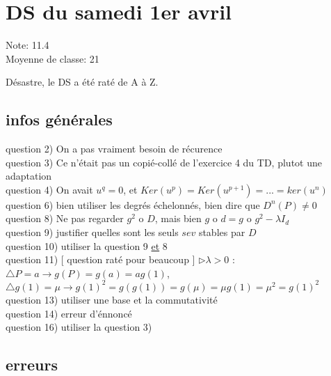 \documentclass{book}
\begin{document}
\section{DS du samedi 1er avril }

Note: 11.4\\
Moyenne de classe: 21 \\


\begin{tcolorbox}[width={14cm},colback={yellow!20!white},title={\textbf{Commentaire générale sur ce DS}},colbacktitle=red!40!white,coltitle=black]    
	Désastre, le DS a été raté de A à Z.
\end{tcolorbox}


\subsection{infos générales}

question 2) On a pas vraiment besoin de récurence \\
question 3) Ce n'était pas un copié-collé de l'exercice 4 du TD, plutot une adaptation \\
question 4) On avait $u^q= 0$, et $Ker(u^p) = Ker(u^{p+1}) = ... = ker(u^n)$ \\
question 6) bien utiliser les degrés échelonnés, bien dire que $D^n(P) \not = 0$ \\
question 8) Ne pas regarder $g^2$ o $D$, mais bien $g$ o $d = g$ o $g^2 - \lambda I_d$ \\
question 9) justifier quelles sont les seuls $sev$ stables par $D$ \\
question 10) utiliser la question 9 \underline{et} 8 \\
question 11) [ question raté pour beaucoup ] $\rhd \lambda > 0$ : $\triangle P = a \rightarrow g(P) = g(a) = ag(1)$, $\triangle g(1) = \mu \rightarrow g(1)^2 = g(g(1)) = g(\mu) = \mu g(1) = \mu^2 = g(1)^2$ \\
question 13) utiliser une base et la commutativité \\
question 14) erreur d'énnoncé \\
question 16) utiliser la question 3)


\subsection{erreurs}
\end{document}
